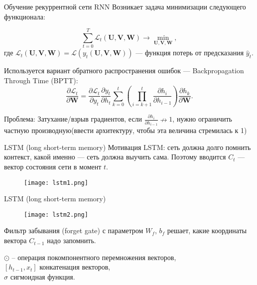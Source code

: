 \documentclass[11pt]{beamer}
\begin{document}
	\begin{frame}{ Обучение рекуррентной сети RNN}
		Возникает задача минимизации следующего функционала:

		\begin{equation*}
		\sum_{t=0}^{T} \mathcal{L}_t (\mathbf{U}, \mathbf{V}, \mathbf{W}) \rightarrow \min_{\mathbf{U},\mathbf{ V}, \mathbf{W}},
		\end{equation*}
		где $\mathcal{L}_t (\mathbf{U}, \mathbf{V}, \mathbf{W}) = \mathcal{L} (y_t(\mathbf{U}, \mathbf{V}, \mathbf{W}))$ --- функция потерь от предсказания $\hat{y}_t$.

		Используется вариант обратного распространения ошибок --- Backpropagation Through Time (BPTT):
		\begin{equation*}
			\dfrac{\partial \mathcal{L}_t}{\partial \mathbf{W}} = \dfrac{\partial \mathcal{L}_t}{\partial y_t} \dfrac{\partial y_t}{\partial h_t} \sum_{k=0}^t \left( \prod_{i = k + 1}^t \dfrac{\partial h_i}{\partial h_{i-1}} \right) \dfrac{\partial h_k}{\partial \mathbf{W}}.
		\end{equation*}

		Проблема:
		Затухание/взрыв градиентов, если $\frac{\partial h_i}{\partial h_{i-1}}\nrightarrow 1$, нужно ограничить частную
		производную(ввести архитектуру, чтобы эта величина стремилась к 1)
	\end{frame}

 	\begin{frame}{LSTM (long short-term memory)}
 		Мотивация LSTM: сеть должна долго помнить контекст, какой именно —
		сеть должна выучить сама. Поэтому вводится $C_t$ — вектор состояния сети
		в момент $t$.
      	\begin{figure}
	        \centering
	        \texttt{[image: lstm1.png]}  
	    \end{figure}
 	\end{frame}
 
 	\begin{frame}{LSTM (long short-term memory)}
		 \begin{figure}
	        \centering
	        \texttt{[image: lstm2.png]}
	    \end{figure}


		Фильтр забывания (forget gate) с параметром $W_f$, $b_f$ решает,
		какие координаты вектора $C_{t−1}$ надо запомнить.

		$\odot$ -- операция покомпонентного перемножения векторов,\\$[h_{t-1},x_t]$ конкатенация векторов,\\
		$\sigma$ сигмоидная функция.
 	\end{frame}
 
\end{document}
